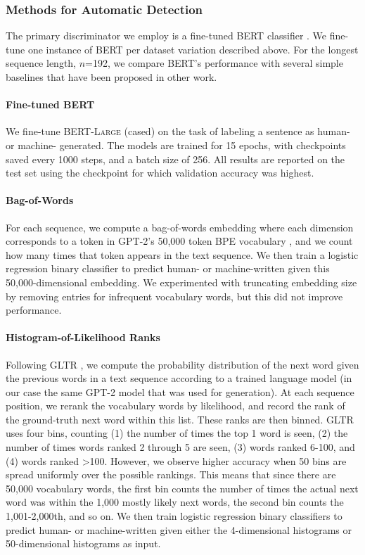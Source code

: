 \subsubsection{Methods for Automatic Detection}
The primary discriminator we employ is a fine-tuned BERT classifier \citep{devlin2018bert}.
We fine-tune one instance of BERT per dataset variation described above.
For the longest sequence length, $n$=192, we compare BERT's performance with several simple baselines that have been proposed in other work.

\paragraph{Fine-tuned BERT}
We fine-tune BERT-\textsc{Large} (cased) on the task of labeling a sentence as human- or machine- generated.
The models are trained for 15 epochs, with checkpoints saved every 1000 steps, and a batch size of 256.
All results are reported on the test set using the checkpoint for which validation accuracy was highest.

\paragraph{Bag-of-Words}
For each sequence, we compute a bag-of-words embedding where each dimension corresponds to a token in GPT-2's  50,000 token BPE vocabulary \citep{sennrich2016neural}, and we count how many times that token appears in the text sequence. 
We then train a logistic regression binary classifier to predict human- or machine-written given this 50,000-dimensional embedding.
We experimented with truncating embedding size by removing entries for infrequent vocabulary words, but this did not improve performance.

\paragraph{Histogram-of-Likelihood Ranks}
Following GLTR \citep{gehrmann2019gltr}, we compute the probability distribution of the next word given the previous words in a text sequence according to a trained language model (in our case the same GPT-2 model that was used for generation).
At each sequence position, we rerank the vocabulary words by likelihood, and record the rank of the ground-truth next word within this list.
These ranks are then binned.
GLTR uses four bins, counting (1) the number of times the top 1 word is seen, (2) the number of times words ranked 2 through 5 are seen, (3) words ranked 6-100, and (4) words ranked \textgreater100.
However, we observe higher accuracy when 50 bins are spread uniformly over the possible rankings.
This means that since there are 50,000 vocabulary words, the first bin counts the number of times the actual next word was within the 1,000 mostly likely next words, the second bin counts the 1,001-2,000th, and so on.
We then train logistic regression binary classifiers to predict human- or machine-written given either the 4-dimensional histograms or 50-dimensional histograms as input.

